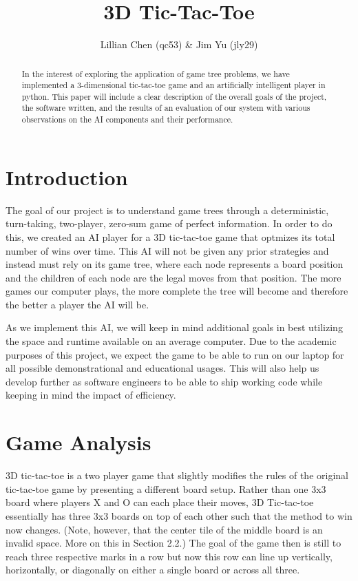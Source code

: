 \documentclass[preprint,12pt]{elsarticle}
\begin{document}
\begin{frontmatter}
	\title{3D Tic-Tac-Toe}
	\author{Lillian Chen (qc53) \& Jim Yu (jly29)}
	\address{Cornell University}

	\begin{abstract}
		In the interest of exploring the application of game tree problems, we have implemented a 3-dimensional tic-tac-toe game and an artificially intelligent player in python. This paper will include a clear description of the overall goals of the project, the software written, and the results of an evaluation of our system with various observations on the AI components and their performance.
	\end{abstract}
\end{frontmatter}

\section{Introduction}
	The goal of our project is to understand game trees through a deterministic, turn-taking, two-player, zero-sum game of perfect information. In order to do this, we created an AI player for a 3D tic-tac-toe game that optmizes its total number of wins over time. This AI will not be given any prior strategies and instead must rely on its game tree, where each node represents a board position and the children of each node are the legal moves from that position. The more games our computer plays, the more complete the tree will become and therefore the better a player the AI will be.

	As we implement this AI, we will keep in mind additional goals in best utilizing the space and runtime available on an average computer. Due to the academic purposes of this project, we expect the game to be able to run on our laptop for all possible demonstrational and educational usages. This will also help us develop further as software engineers to be able to ship working code while keeping in mind the impact of efficiency.

\section{Game Analysis}
	3D tic-tac-toe is a two player game that slightly modifies the rules of the original tic-tac-toe game by presenting a different board setup. Rather than one 3x3 board where players X and O can each place their moves, 3D Tic-tac-toe essentially has three 3x3 boards on top of each other such that the method to win now changes. (Note, however, that the center tile of the middle board is an invalid space. More on this in Section 2.2.) The goal of the game then is still to reach three respective marks in a row but now this row can line up vertically, horizontally, or diagonally on either a single board or across all three.
\end{document}
